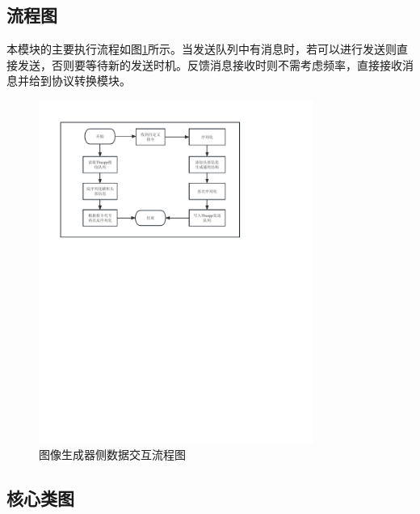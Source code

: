 \subsection{流程图}

本模块的主要执行流程如图\ref{module31}所示。当发送队列中有消息时，若可以进行发送则直接发送，否则要等待新的发送时机。反馈消息接收时则不需考虑频率，直接接收消息并给到协议转换模块。
\begin{figure}[h!]
    \begin{center}
        \includegraphics[width=0.8\textwidth]{pictures/flowchart3.pdf}
        \caption{图像生成器侧数据交互流程图}
        \label{module31}
    \end{center}
\end{figure}
\subsection{核心类图}

